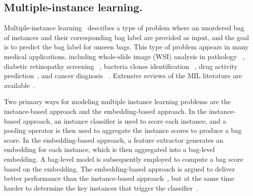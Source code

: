 
\subsection{Multiple-instance learning.}
Multiple-instance learning~\citep{dietterich1997solving,maron1997framework} describes a type of problem where an unordered bag of instances and their corresponding bag label are provided as input, and the goal is to predict the bag label for unseen bags. 
This type of problem appears in many medical applications, including whole-slide image (WSI) analysis in pathology~
\citep{cosatto2013automated,shao2021transmil,li2021dual},
diabetic retinopathy screening ~\citep{quellec2012multiple, li2021deep, li2021multi, kandemir2015computer}, bacteria clones identification ~\citep{borowa2020classifying}, drug activity prediction~\citep{dietterich1997solving, zhao2013drug}, and cancer diagnosis ~\citep{campanella2019clinical, chikontwe2020multiple, hou2016patch, ding2012breast, xu2014weakly}. 
Extensive reviews of the MIL literature are available~\citep{zhou2004multi, quellec2017multiple,carbonneau2018multiple}.



Two primary ways for modeling multiple instance learning problems are the instance-based approach and the embedding-based approach. In the instance-based approach, an instance classifier is used to score each instance, and a pooling operator is then used to aggregate the instance scores to produce a bag score. In the embedding-based approach, a feature extractor generates an embedding for each instance, which is then aggregated into a bag-level embedding. A bag-level model is subsequently employed to compute a bag score based on the embedding. The embedding-based approach is argued to deliver better performance than the instance-based approach~\citep{wang2018revisiting}, but at the same time harder to determine the key instances that trigger the classifier~\citep{liu2017detecting}. 


